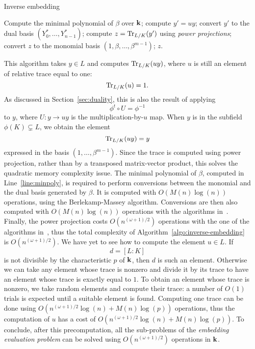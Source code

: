 \begin{algorithm}
  \caption{Inverse embedding}
  \label{algo:inverse-embedding}
  \begin{algorithmic}[1]
    \State\label{line:minpoly} Compute the minimal polynomial of $\beta$ over $\mathbf{k}$;
    \State compute $y'=uy$;
    \State convert $y'$ to the dual basis $(Y_0^*, \dots, Y_{n-1}^*)$;
    \State compute $z = \operatorname{Tr}_{L/K}(y')$ using \emph{power projections};
    \State convert $z$ to the monomial basis $(1, \beta, \dots, \beta^{m-1})$;
    \State \Return $z$.
  \end{algorithmic}
\end{algorithm}
This algorithm takes $y\in L$ and computes
$\operatorname{Tr}_{L/K}(uy)$, where $u$ is still an element of relative trace equal to one:
\[
  \operatorname{Tr}_{L/K}(u)=1.
\]
As discussed in Section~\ref{sec:duality}, this is also the result of applying
\[
  \phi^t\circ U = \phi^{-1}
\]
to $y$, where $U:y\to uy$ is the multiplication-by-$u$ map. When $y$ is in the
subfield $\phi(K)\subsetneq L$, we obtain the element
\[
  \operatorname{Tr}_{L/K}(uy) = y
\]
expressed in the basis $(1, \dots, \beta^{m-1})$. Since the trace is computed
using power projection, rather than by a transposed matrix-vector product, this
solves the quadratic memory complexity issue. The minimal polynomial of $\beta$,
computed in Line~\ref{line:minpoly}, is required to perform conversions
between the monomial and the dual basis generated by $\beta$. It is computed
with $O(M(n)\log(n))$ operations, using the Berlekamp-Massey algorithm.
Conversions are then also computed with $O(M(n)\log(n))$ operations with the
algorithms in~\cite{DDS14}. Finally, the power projection costs $O(n^{(\omega
+1)/2})$ operations with the one of the algorithms in~\cite{Shoup95, KU08}, thus
the total complexity of Algorithm~\ref{algo:inverse-embedding} is
$O(n^{(\omega+1)/2})$. We have yet to see how to compute the element $u\in L$.
If
\[
  d = [L:K]
\]
is not divisible by the characteristic $p$ of $\mathbf{k}$, then $d$ is such an element.
Otherwise we can take any element whose trace is nonzero and divide it by its
trace to have an element whose trace is exactly equal to $1$. To obtain an
element whose trace is nonzero, we take random elements and compute
their trace: a number of $O(1)$ trials is expected until a suitable element is
found. Computing one trace can be done using
$O(n^{(\omega+1)/2}\log(n)+M(n)\log(p))$ operations, thus the computation of $u$ has
a cost of $O(n^{(\omega+1)/2}\log(n)+M(n)\log(p))$. To conclude, after this
precomputation, all the sub-problems of the \emph{embedding evaluation problem}
can be solved using $O(n^{(\omega+1)/2})$ operations in $\mathbf{k}$.

%

